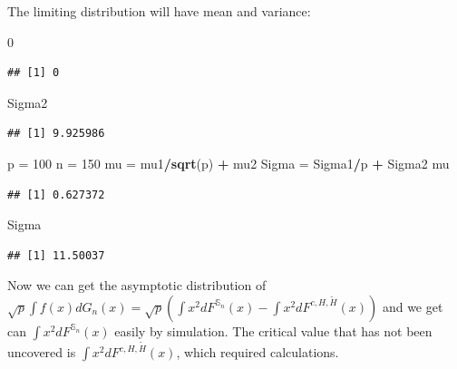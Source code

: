 \documentclass[
]{article}
\newenvironment{Shaded}{\begin{snugshade}}{\end{snugshade}}
\newcommand{\DecValTok}[1]{\textcolor[rgb]{0.00,0.00,0.81}{#1}}
\newcommand{\FunctionTok}[1]{\textcolor[rgb]{0.13,0.29,0.53}{\textbf{#1}}}
\newcommand{\NormalTok}[1]{#1}
\newcommand{\OtherTok}[1]{\textcolor[rgb]{0.56,0.35,0.01}{#1}}
\newcommand{\SpecialCharTok}[1]{\textcolor[rgb]{0.81,0.36,0.00}{\textbf{#1}}}
\begin{document}
The limiting distribution will have mean and variance:

\begin{Shaded}
\begin{Highlighting}[]
\DecValTok{0}
\end{Highlighting}
\end{Shaded}

\begin{verbatim}
## [1] 0
\end{verbatim}

\begin{Shaded}
\begin{Highlighting}[]
\NormalTok{Sigma2}
\end{Highlighting}
\end{Shaded}

\begin{verbatim}
## [1] 9.925986
\end{verbatim}

\begin{Shaded}
\begin{Highlighting}[]
\NormalTok{p }\OtherTok{=} \DecValTok{100}
\NormalTok{n }\OtherTok{=} \DecValTok{150}
\NormalTok{mu }\OtherTok{=}\NormalTok{ mu1}\SpecialCharTok{/}\FunctionTok{sqrt}\NormalTok{(p) }\SpecialCharTok{+}\NormalTok{ mu2}
\NormalTok{Sigma }\OtherTok{=}\NormalTok{ Sigma1}\SpecialCharTok{/}\NormalTok{p }\SpecialCharTok{+}\NormalTok{ Sigma2}
\NormalTok{mu}
\end{Highlighting}
\end{Shaded}

\begin{verbatim}
## [1] 0.627372
\end{verbatim}

\begin{Shaded}
\begin{Highlighting}[]
\NormalTok{Sigma}
\end{Highlighting}
\end{Shaded}

\begin{verbatim}
## [1] 11.50037
\end{verbatim}

Now we can get the asymptotic distribution of
\(\sqrt p \int f(x) dG_n(x) = \sqrt p (\int x^2dF^{\mathbb{S}_n}(x) - \int x^2dF^{c, H, \tilde H}(x))\)
and we get can \(\int x^2dF^{\mathbb{S}_n}(x)\) easily by simulation.
The critical value that has not been uncovered is
\(\int x^2dF^{c, H, \tilde H}(x)\), which required calculations.
\end{document}
